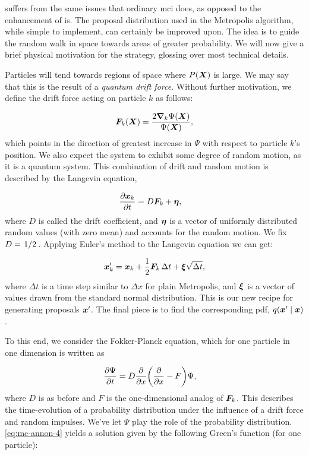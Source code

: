 \documentclass[Thesis.tex]{subfiles}
\begin{document}
 suffers from the same issues that ordinary \gls{mci}
does, as opposed to the enhancement of \gls{is}. The proposal
distribution used in the Metropolis algorithm, while simple to implement, can
certainly be improved upon. The idea is to guide the random walk in space
towards areas of greater probability. We will now give a brief physical
motivation for the strategy, glossing over most technical details.

Particles will tend towards regions of space where $P(\bm{X})$ is large. We may say
that this is the result of a \emph{quantum drift force}. Without further
motivation, we define the drift force acting on particle $k$ as follows:

\begin{align}
  \bm{F}_k(\bm{X}) = \frac{2\grad_k{\Psi(\bm{X})}}{\Psi(\bm{X})},
\end{align}
which points in the direction of greatest increase in $\Psi$ with respect to
particle $k$'s position. We also expect the
system to exhibit some degree of random motion, as it is a quantum system. This
combination of drift and random motion is described by the Langevin equation,

\begin{align}
 \pdv{\bm{x}_k}{t} &= D\bm{F}_k + \bm{\eta},
\end{align}
where $D$ is called the drift coefficient, and $\bm{\eta}$ is a vector of
uniformly distributed random values (with zero mean) and accounts for the random
motion. We fix $D=\flatfrac{1}{2}$. Applying Euler's method to the Langevin
equation we can get:

\begin{align}
  \bm{x}_k' = \bm{x}_k + \frac{1}{2}\bm{F}_k\,\Delta t + \bm{\xi}\sqrt{\Delta t},
\end{align}
where $\Delta t$ is a time step similar to $\Delta x$ for plain Metropolis, and
$\bm{\xi}$ is a vector of values drawn from the standard normal distribution.
This is our new recipe for generating proposals $\bm{x}'$. The final piece is
to find the corresponding \gls{pdf},
$q\qty(\bm{x}'\;\middle|\;\bm{x})$.

To this end, we consider the Fokker-Planck equation, which for one particle in
one dimension is written as

\begin{align}
  \label{eq:mc-annon-4}
  \pdv{\Psi}{t} &= D\pdv{}{x}\qty(\pdv{}{x} - F)\Psi,
\end{align}
where $D$ is as before and $F$ is the one-dimensional analog of $\bm{F}_k$. This
describes the time-evolution of a probability distribution under the influence
of a drift force and random impulses. We've let $\Psi$ play the role of the
probability distribution. \cref{eq:mc-annon-4} yields a solution given by the
following Green's function (for one particle):
\end{document}
